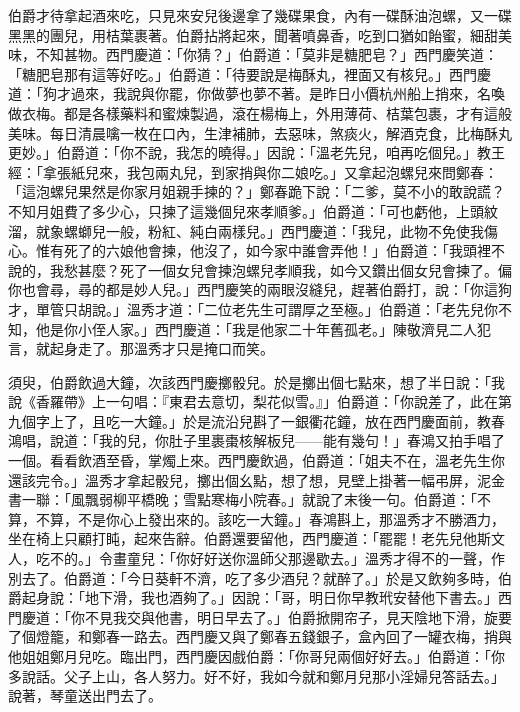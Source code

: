 伯爵才待拿起酒來吃，只見來安兒後邊拿了幾碟果食，內有一碟酥油泡螺，又一碟黑黑的團兒，用桔葉裹著。伯爵拈將起來，聞著噴鼻香，吃到口猶如飴蜜，細甜美味，不知甚物。西門慶道：「你猜？」伯爵道：「莫非是糖肥皂？」西門慶笑道：「糖肥皂那有這等好吃。」伯爵道：「待要說是梅酥丸，裡面又有核兒。」西門慶道：「狗才過來，我說與你罷，你做夢也夢不著。是昨日小價杭州船上捎來，名喚做衣梅。都是各樣藥料和蜜煉製過，滾在楊梅上，外用薄荷、桔葉包裹，才有這般美味。每日清晨噙一枚在口內，生津補肺，去惡味，煞痰火，解酒克食，比梅酥丸更妙。」伯爵道：「你不說，我怎的曉得。」因說：「溫老先兒，咱再吃個兒。」教王經：「拿張紙兒來，我包兩丸兒，到家捎與你二娘吃。」又拿起泡螺兒來問鄭春：「這泡螺兒果然是你家月姐親手揀的？」鄭春跪下說：「二爹，莫不小的敢說謊？不知月姐費了多少心，只揀了這幾個兒來孝順爹。」伯爵道：「可也虧他，上頭紋溜，就象螺螄兒一般，粉紅、純白兩樣兒。」西門慶道：「我兒，此物不免使我傷心。惟有死了的六娘他會揀，他沒了，如今家中誰會弄他！」伯爵道：「我頭裡不說的，我愁甚麼？死了一個女兒會揀泡螺兒孝順我，如今又鑽出個女兒會揀了。偏你也會尋，尋的都是妙人兒。」西門慶笑的兩眼沒縫兒，趕著伯爵打，說：「你這狗才，單管只胡說。」溫秀才道：「二位老先生可謂厚之至極。」伯爵道：「老先兒你不知，他是你小侄人家。」西門慶道：「我是他家二十年舊孤老。」陳敬濟見二人犯言，就起身走了。那溫秀才只是掩口而笑。

須臾，伯爵飲過大鐘，次該西門慶擲骰兒。於是擲出個七點來，想了半日說：「我說《香羅帶》上一句唱：『東君去意切，梨花似雪。』」伯爵道：「你說差了，此在第九個字上了，且吃一大鐘。」於是流沿兒斟了一銀衢花鐘，放在西門慶面前，教春鴻唱，說道：「我的兒，你肚子里裹棗核解板兒——能有幾句！」春鴻又拍手唱了一個。看看飲酒至昏，掌燭上來。西門慶飲過，伯爵道：「姐夫不在，溫老先生你還該完令。」溫秀才拿起骰兒，擲出個幺點，想了想，見壁上掛著一幅弔屏，泥金書一聯：「風飄弱柳平橋晚；雪點寒梅小院春。」就說了末後一句。伯爵道：「不算，不算，不是你心上發出來的。該吃一大鐘。」春鴻斟上，那溫秀才不勝酒力，坐在椅上只顧打盹，起來告辭。伯爵還要留他，西門慶道：「罷罷！老先兒他斯文人，吃不的。」令畫童兒：「你好好送你溫師父那邊歇去。」溫秀才得不的一聲，作別去了。伯爵道：「今日葵軒不濟，吃了多少酒兒？就醉了。」於是又飲夠多時，伯爵起身說：「地下滑，我也酒夠了。」因說：「哥，明日你早教玳安替他下書去。」西門慶道：「你不見我交與他書，明日早去了。」伯爵掀開帘子，見天陰地下滑，旋要了個燈籠，和鄭春一路去。西門慶又與了鄭春五錢銀子，盒內回了一罐衣梅，捎與他姐姐鄭月兒吃。臨出門，西門慶因戲伯爵：「你哥兒兩個好好去。」伯爵道：「你多說話。父子上山，各人努力。好不好，我如今就和鄭月兒那小淫婦兒答話去。」說著，琴童送出門去了。

